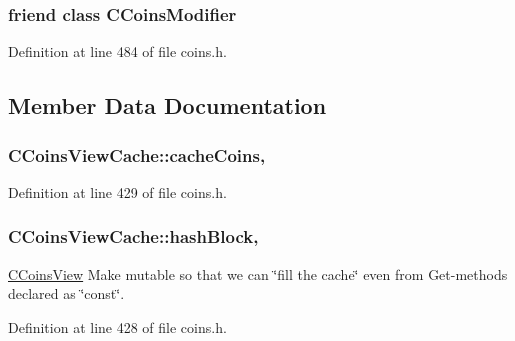 \subsubsection[{C\+Coins\+Modifier}]{\setlength{\rightskip}{0pt plus 5cm}friend class {\bf C\+Coins\+Modifier}\hspace{0.3cm}{\ttfamily [friend]}}\label{class_c_coins_view_cache_ae6ce8219acb79950bced74cb108acacf}


Definition at line 484 of file coins.\+h.



\subsection{Member Data Documentation}
\hypertarget{class_c_coins_view_cache_af33cc2c6d38af65ac833d4d13c8e3764}{}
\subsubsection[{cache\+Coins}]{ C\+Coins\+View\+Cache\+::cache\+Coins\hspace{0.3cm}{\ttfamily [mutable]}, {\ttfamily [protected]}}\label{class_c_coins_view_cache_af33cc2c6d38af65ac833d4d13c8e3764}


Definition at line 429 of file coins.\+h.

\hypertarget{class_c_coins_view_cache_a229dddddbc5501edc250209a2ce5df8b}{}
\subsubsection[{hash\+Block}]{ C\+Coins\+View\+Cache\+::hash\+Block\hspace{0.3cm}{\ttfamily [mutable]}, {\ttfamily [protected]}}\label{class_c_coins_view_cache_a229dddddbc5501edc250209a2ce5df8b}
\hyperlink{class_c_coins_view}{C\+Coins\+View} Make mutable so that we can \char`\"{}fill the cache\char`\"{} even from Get-\/methods declared as \char`\"{}const\char`\"{}. 

Definition at line 428 of file coins.\+h.

\hypertarget{class_c_coins_view_cache_a363e27234d36bb0fc533d60cd64d1bc3}{}
